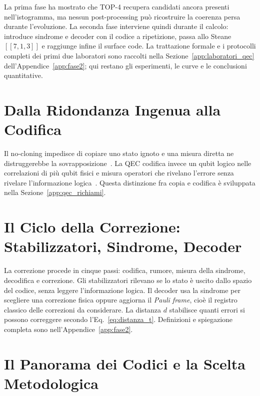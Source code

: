 \begin{onehalfspace}

La prima fase ha mostrato che TOP-4 recupera candidati ancora presenti
nell'istogramma, ma nessun post-processing può ricostruire la coerenza
persa durante l'evoluzione. La seconda fase interviene quindi durante il
calcolo: introduce sindrome e decoder con il codice a ripetizione, passa
allo Steane $[[7,1,3]]$ e raggiunge infine il surface code. La trattazione
formale e i protocolli completi dei primi due laboratori sono raccolti
nella Sezione~\ref{app:laboratori_qec} dell'Appendice~\ref{app:fase2}; qui
restano gli esperimenti, le curve e le conclusioni quantitative.

\section{Dalla Ridondanza Ingenua alla Codifica}
\label{sec:ridondanza_codifica}

Il no-cloning impedisce di copiare uno stato ignoto e una misura diretta
ne distruggerebbe la sovrapposizione~\cite{wootters1982}. La \ac{QEC}
codifica invece un qubit logico nelle correlazioni di più qubit fisici e
misura operatori che rivelano l'errore senza rivelare l'informazione
logica~\cite{shorcorrection1995,steane1996,roffe2019}. Questa distinzione
fra copia e codifica è sviluppata nella Sezione~\ref{app:qec_richiami}.

\section{Il Ciclo della Correzione: Stabilizzatori, Sindrome, Decoder}
\label{sec:ciclo_qec}

La correzione procede in cinque passi: codifica, rumore, misura della sindrome, decodifica e correzione. Gli stabilizzatori rilevano se lo stato è uscito dallo spazio del codice, senza leggere l'informazione logica. Il decoder usa la sindrome per scegliere una correzione fisica oppure aggiorna il \emph{Pauli frame}, cioè il registro classico delle correzioni da considerare. La distanza $d$ stabilisce quanti errori si possono correggere secondo l'Eq.~\ref{eq:distanza_t}. Definizioni e spiegazione completa sono nell'Appendice~\ref{app:fase2}.

\section{Il Panorama dei Codici e la Scelta Metodologica}
\label{sec:confronto_codici}


\end{onehalfspace}
